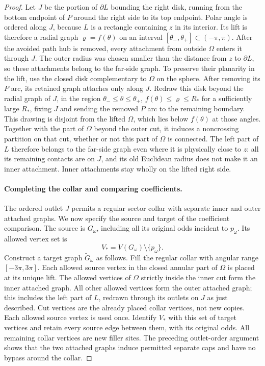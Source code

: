 \begin{proof}
Let $J$ be the portion of $\partial L$ bounding the right disk,
running from the bottom endpoint of $P$ around the right side to its
top endpoint.  Polar angle is ordered along $J$, because $L$ is a
rectangle containing $z$ in its interior.  Its lift is therefore a
radial graph $\varrho=f(\theta)$ on an interval
$[\theta_-,\theta_+]\subset(-\pi,\pi)$.  After the avoided path
hub is removed, every attachment from outside $\Omega$ enters it
through $J$.  The outer radius was chosen smaller than the distance
from $z$ to $\partial L$, so these attachments belong to the far-side
graph.  To preserve their planarity in the lift, use the closed disk
complementary to $\Omega$ on the sphere.  After removing its $P$ arc,
its retained graph attaches only along $J$.  Redraw this disk beyond
the radial graph of $J$, in the region
$\theta_-\le\theta\le\theta_+$,
$f(\theta)\le\varrho\le R_*$ for a sufficiently large $R_*$,
fixing $J$ and sending the removed $P$ arc to the remaining boundary.
This drawing is disjoint from the lifted $\Omega$, which lies below
$f(\theta)$ at those angles.  Together with the part of $\Omega$
beyond the outer cut, it induces a noncrossing partition on that cut,
whether or not this part of $\Omega$ is connected.
The left part of $L$ therefore belongs to the far-side graph even where
it is physically close to $z$: all its remaining contacts are on $J$,
and its old Euclidean radius does not make it an inner attachment.
Inner attachments stay wholly on the lifted right side.



\paragraph{Completing the collar and comparing coefficients.}
The ordered outlet $J$ permits a regular sector collar with separate
inner and outer attached graphs.  We now specify the source and target
of the coefficient comparison.  The
source is $G_\omega$, including all its original odds incident to
$p_\omega$.  Its allowed vertex set is
\[
 V_*=V(G_\omega)\setminus\{p_\omega\}.
\]
Construct a target graph $\widetilde G_\omega$ as follows.  Fill the
regular collar with angular range $[-3\pi,3\pi]$.  Each allowed source
vertex in the closed annular part of $\Omega$ is placed at its unique
lift.
The allowed vertices of $\Omega$ strictly inside the inner cut form
the inner attached graph.  All other allowed vertices form the outer
attached graph; this includes the left part of $L$, redrawn through its
outlets on $J$ as just described.  Cut vertices are the already placed collar
vertices, not new copies.  Each allowed source vertex is used once.
Identify $V_*$ with this set of target vertices and retain every
source edge between them, with its original odds.  All remaining
collar vertices are new filler sites.  The preceding outlet-order
argument shows that the two attached graphs induce permitted separate
caps and have no bypass around the collar.


\end{proof}
